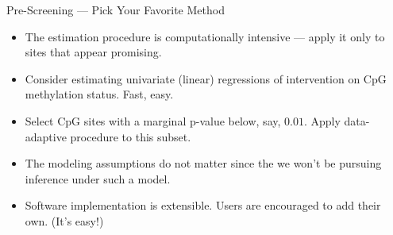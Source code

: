 \documentclass[12pt,t]{beamer}
\begin{document}
\begin{frame}[c]{Pre-Screening --- Pick Your Favorite Method}

\begin{center}
\begin{itemize}
  \itemsep10pt
  \item The estimation procedure is computationally intensive --- apply it only
    to sites that appear promising.
  \item Consider estimating univariate (linear) regressions of intervention on
    CpG methylation status. Fast, easy.
  \item Select CpG sites with a marginal p-value below, say, $0.01$. Apply
    data-adaptive procedure to this subset.
  \item The modeling assumptions do not matter since the we won't be pursuing
    inference under such a model.
  \item Software implementation is extensible. Users are encouraged to add their
    own. (It's easy!)
\end{itemize}
\end{center}


\end{frame}

\end{document}
